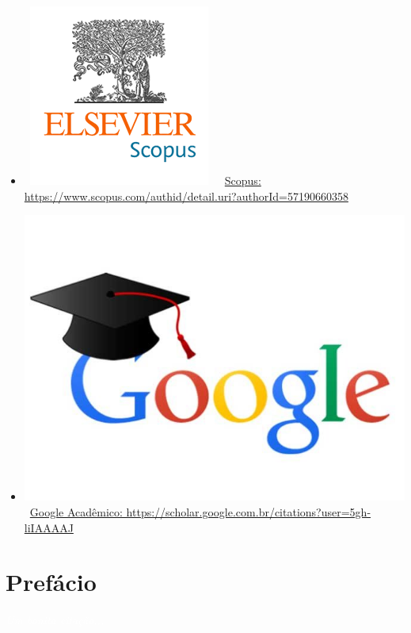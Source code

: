 \documentclass[11pt,fleqn]{book} %
\begin{document}
\begin{itemize}
	\item~\includegraphics[scale=.05]{Pictures/scopus}~~~\href{https://www.scopus.com/authid/detail.uri?authorId=57190660358}{Scopus: https://www.scopus.com/authid/detail.uri?authorId=57190660358}
	\item \includegraphics[scale=.03]{Pictures/google}~\href{https://scholar.google.com.br/citations?user=5gh-liIAAAAJ}{Google Acadêmico: https://scholar.google.com.br/citations?user=5gh-liIAAAAJ}
\end{itemize}

\renewcommand\contentsname{Sumário}
\tableofcontents

\chapter{Prefácio}\label{prefacio}
\vspace{6em}
\begin{flushright}
	\textit{\textcolor{white}{Um bonita citação...}}
\end{flushright}
\vspace{12em}
\end{document}
